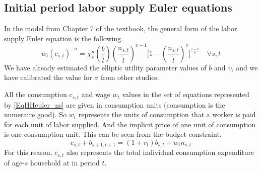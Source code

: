 \documentclass[letterpaper,12pt]{article}
\theoremstyle{definition}
\begin{document}




\subsection{Initial period labor supply Euler equations}

  In the model from Chapter 7 of the textbook, the general form of the labor supply Euler equation is the following.
  \begin{equation}\label{EqHHeuler_ns}
    w_t\left(c_{s,t}\right)^{-\sigma} = \chi^n_s\left(\frac{b}{\tilde{l}}\right)\left(\frac{n_{s,t}}{\tilde{l}}\right)^{\upsilon-1}\Biggl[1 - \left(\frac{n_{s,t}}{\tilde{l}}\right)^\upsilon\Biggr]^{\frac{1-\upsilon}{\upsilon}} \quad\forall s, t
  \end{equation}
  We have already estimated the elliptic utility parameter values of $b$ and $\upsilon$, and we have calibrated the value for $\sigma$ from other studies.

  All the consumption $c_{s,t}$ and wage $w_t$ values in the set of equations represented by \eqref{EqHHeuler_ns} are given in consumption units (consumption is the numeraire good). So $w_t$ represents the units of consumption that a worker is paid for each unit of labor supplied. And the implicit price of one unit of consumption is one consumption unit. This can be seen from the budget constraint.
  \begin{equation}\label{EqHHbc}
    c_{s,t} + b_{s+1,t+1} = (1 + r_t)b_{s,t} + w_t n_{s,t}
  \end{equation}
  For this reason, $c_{s,t}$ also represents the total individual consumption expenditure of age-$s$ household at in period $t$.
\end{document}
